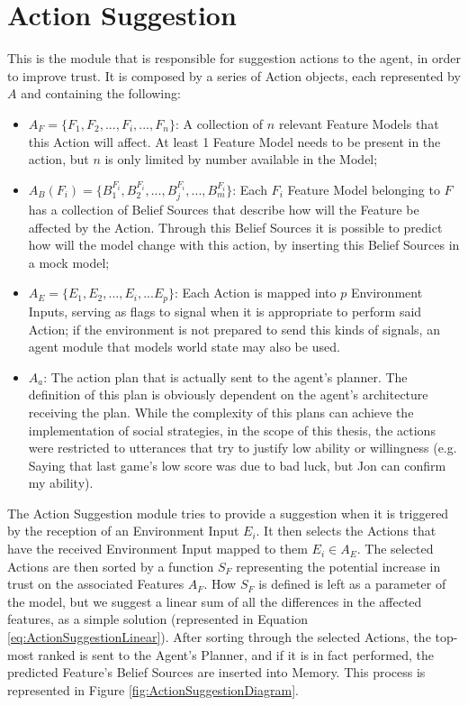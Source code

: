 \section{Action Suggestion}
This is the module that is responsible for suggestion actions to the agent, in order to improve trust. It is composed by a series of Action objects, each represented by $A$ and containing the following:
\begin{itemize}
    \item $A_F = \{F_1, F_2, ..., F_i, ..., F_n\}$: A collection of $n$ relevant Feature Models that this Action will affect. At least 1 Feature Model needs to be present in the action, but $n$ is only limited by number available in the Model;
    \item $A_B(F_i) = \{B_1^{F_i}, B_2^{F_i}, ..., B_j^{F_i}, ..., B_m^{F_i}\}$: Each $F_i$ Feature Model belonging to $F$ has a collection of Belief Sources that describe how will the Feature be affected by the Action. Through this Belief Sources it is possible to predict how will the model change with this action, by inserting this Belief Sources in a mock model;
    \item $A_E = \{E_1, E_2, ..., E_i, ... E_p\}$: Each Action is mapped into $p$ Environment Inputs, serving as flags to signal when it is appropriate to perform said Action; if the environment is not prepared to send this kinds of signals, an agent module that models world state may also be used.
    \item $A_a$: The action plan that is actually sent to the agent's planner. The definition of this plan is obviously dependent on the agent's architecture receiving the plan. While the complexity of this plans can achieve the implementation of social strategies, in the scope of this thesis, the actions were restricted to utterances that try to justify low ability or willingness (e.g. Saying that last game's low score was due to bad luck, but Jon can confirm my ability).
\end{itemize}

The Action Suggestion module tries to provide a suggestion when it is triggered by the reception of an Environment Input $E_i$. It then selects the Actions that have the received Environment Input mapped to them $E_i \in A_E$. The selected Actions are then sorted by a function $S_F$ representing the potential increase in trust on the associated Features $A_F$. How $S_F$ is defined is left as a parameter of the model, but we suggest a linear sum of all the differences in the affected features, as a simple solution (represented in Equation \ref{eq:ActionSuggestionLinear}). After sorting through the selected Actions, the top-most ranked is sent to the Agent's Planner, and if it is in fact performed, the predicted Feature's Belief Sources are inserted into Memory. This process is represented in Figure \ref{fig:ActionSuggestionDiagram}.

